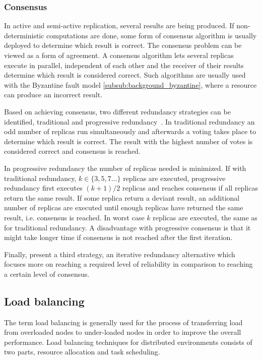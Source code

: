 \documentclass{cslthse-msc}
\begin{document}
\subsubsection{Consensus} \label{subsub:consensus}
In active and semi-active replication, several results are being produced. If non-deterministic computations are done, some form of consensus algorithm is usually deployed to determine which result is correct. The consensus problem can be viewed as a form of agreement. A consensus algorithm lets several replicas execute in parallel, independent of each other and the receiver of their results determine which result is considered correct. Such algorithms are usually used with the Byzantine fault model \cref{subsub:background_byzantine}, where a resource can produce an incorrect result.

Based on achieving consensus, two different redundancy strategies can be identified, traditional and progressive redundancy~\cite{selfAdaptRel}. In traditional redundancy an odd number of replicas run simultaneously and afterwards a voting takes place to determine which result is correct. The result with the highest number of votes is considered correct and consensus is reached.

In progressive redundancy the number of replicas needed is minimized. If with traditional redundancy, $k \in \{3,5,7...\}$ replicas are executed, progressive redundancy first executes $(k+1)/2$ replicas and reaches consensus if all replicas return the same result. If some replica return a deviant result, an additional number of replicas are executed until enough replicas have returned the same result, i.e. consensus is reached. In worst case $k$ replicas are executed, the same as for traditional redundancy. A disadvantage with progressive consensus is that it might take longer time if consensus is not reached after the first iteration.

Finally, \cite{selfAdaptRel} present a third strategy, an iterative redundancy alternative which focuses more on reaching a required level of reliability in comparison to reaching a certain level of consensus.

\subsection{Load balancing} \label{sec:background_load_balancing}
The term load balancing is generally used for the process of transferring load from overloaded nodes to under-loaded nodes in order to improve the overall performance. Load balancing techniques for distributed environments consists of two parts, resource allocation and task scheduling. 
\end{document}

